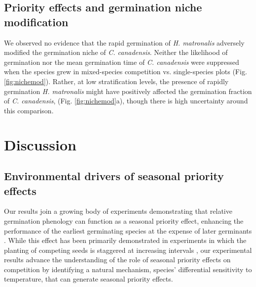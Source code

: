 \documentclass{article}[11pt]
\begin{document}
\subsection*{Priority effects and germination niche modification}
We observed no evidence that the rapid germination of \textit{H. matronalis} adversely modified the germination niche of \textit{C. canadensis}. Neither the likelihood of germination nor the mean germination time of \textit{C. canadensis} were suppressed when the species grew in mixed-species competition vs. single-species plots (Fig. \ref{fig:nichemod}). Rather, at low stratification levels, the presence of rapidly germination \textit{H. matronalis} might have positively affected the germination fraction of \textit{C. canadensis}, (Fig. \ref{fig:nichemod}a), though there is high uncertainty around this comparison.

\section*{Discussion}
\subsection*{Environmental drivers of seasonal priority effects}
Our results join a growing body of experiments demonstrating that relative germination phenology can function as a seasonal priority effect, enhancing the performance of the earliest germinating species at the expense of later germinants \citep{Korner2008,Dickson2012,Ross1972}. While this effect has been primarily demonstrated in experiments in which the planting of competing seeds is staggered at increasing intervals \citep{Young:2017aa,Weidlich:2020aa}, our experimental results advance the understanding of the role of seasonal priority effects on competition by identifying a natural mechanism, species' differential sensitivity to temperature, that can generate seasonal priority effects. 
\end{document}
